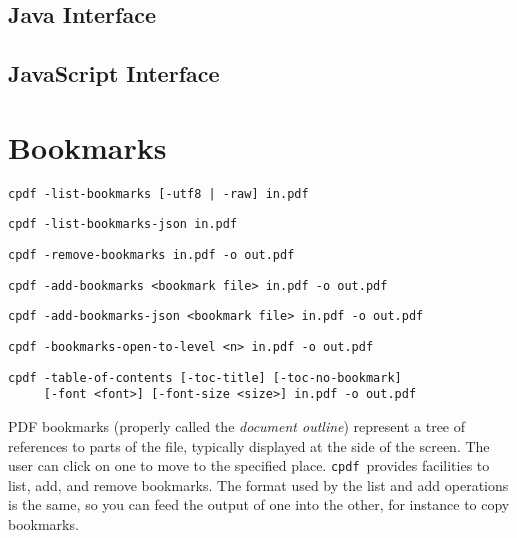 \documentclass{book}
\newcommand{\cpdf}{\texttt{cpdf}}
\begin{document}
\begin{jcpdflib}
\clearpage
\section*{Java Interface}
\begin{small}\tt

\end{small}
\end{jcpdflib}

\begin{jscpdflib}
\clearpage
\section*{JavaScript Interface}
\begin{small}\tt

\end{small}
\end{jscpdflib}

\chapter{Bookmarks}\label{chap:6}
  \begin{framed}
  \small\noindent\verb!cpdf -list-bookmarks [-utf8 | -raw] in.pdf!

  \vspace{1.5mm}
  \small\noindent\verb!cpdf -list-bookmarks-json in.pdf!

  \vspace{1.5mm}
  \small\noindent\verb!cpdf -remove-bookmarks in.pdf -o out.pdf!

  \vspace{1.5mm}
  \small\noindent\verb!cpdf -add-bookmarks <bookmark file> in.pdf -o out.pdf!

  \vspace{1.5mm}
  \small\noindent\verb!cpdf -add-bookmarks-json <bookmark file> in.pdf -o out.pdf!

  \vspace{1.5mm}
  \small\noindent\verb!cpdf -bookmarks-open-to-level <n> in.pdf -o out.pdf!

  \vspace{1.5mm}
  \small\noindent\verb!cpdf -table-of-contents [-toc-title] [-toc-no-bookmark]!\\
  \small\noindent\verb!     [-font <font>] [-font-size <size>] in.pdf -o out.pdf!

  \end{framed}
  PDF bookmarks (properly called the \textit{document outline}) represent a tree
of references to parts of the file, typically displayed at the side of the
screen. The user can click on one to move to the specified place. \cpdf\ provides
facilities to list, add, and remove bookmarks. The format used by the list and
add operations is the same, so you can feed the output of one into the other,
for instance to copy bookmarks.
\end{document}
